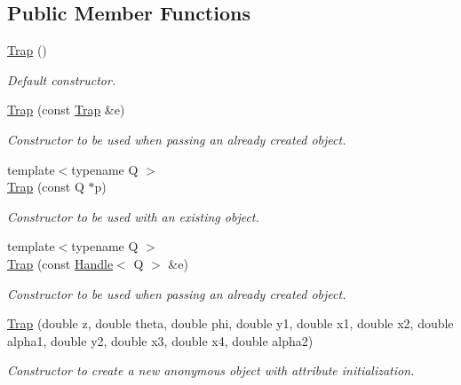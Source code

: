 \subsection*{Public Member Functions}
\begin{DoxyCompactItemize}
\item 
\hyperlink{class_d_d4hep_1_1_geometry_1_1_trap_a470134b52037e1e3d214c39e018872ee}{Trap} ()
\begin{DoxyCompactList}\small\item\em Default constructor. \item\end{DoxyCompactList}\item 
\hyperlink{class_d_d4hep_1_1_geometry_1_1_trap_a9d7a27adb3373cbb54352e0c2a36ce5d}{Trap} (const \hyperlink{class_d_d4hep_1_1_geometry_1_1_trap}{Trap} \&e)
\begin{DoxyCompactList}\small\item\em Constructor to be used when passing an already created object. \item\end{DoxyCompactList}\item 
{\footnotesize template$<$typename Q $>$ }\\\hyperlink{class_d_d4hep_1_1_geometry_1_1_trap_ab956803ea8588582cf855ec1c8fbbc90}{Trap} (const Q $\ast$p)
\begin{DoxyCompactList}\small\item\em Constructor to be used with an existing object. \item\end{DoxyCompactList}\item 
{\footnotesize template$<$typename Q $>$ }\\\hyperlink{class_d_d4hep_1_1_geometry_1_1_trap_ab9fd21cf871d7796a80cad5c3b20ddb4}{Trap} (const \hyperlink{class_d_d4hep_1_1_handle}{Handle}$<$ Q $>$ \&e)
\begin{DoxyCompactList}\small\item\em Constructor to be used when passing an already created object. \item\end{DoxyCompactList}\item 
\hyperlink{class_d_d4hep_1_1_geometry_1_1_trap_a94f6d7bb5674a6d9f885fd0a90f0afe7}{Trap} (double z, double theta, double phi, double y1, double x1, double x2, double alpha1, double y2, double x3, double x4, double alpha2)
\begin{DoxyCompactList}\small\item\em Constructor to create a new anonymous object with attribute initialization. \item\end{DoxyCompactList}\item 

\end{DoxyCompactItemize}
